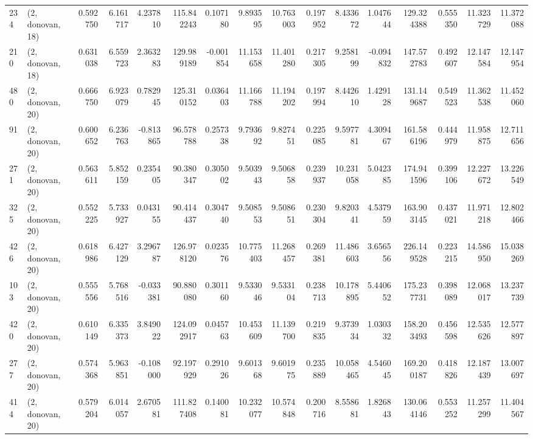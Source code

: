 \begin{tabular}{llrrrrrrrrrrrrrr}
234 &  (2, donovan, 18) &   0.592750 &   6.161717 &   4.237810 &   115.842243 &   0.107180 &   9.893595 &  10.763003 &  0.197952 &   8.433672 &   1.047644 &   129.324388 &  0.555350 &  11.323729 &  11.372088 \\
210 &  (2, donovan, 18) &   0.631038 &   6.559723 &   2.363283 &   129.989189 &  -0.001854 &  11.153658 &  11.401280 &  0.217305 &   9.258199 &  -0.094832 &   147.572783 &  0.492607 &  12.147584 &  12.147954 \\
480 &  (2, donovan, 20) &   0.666750 &   6.923079 &   0.782945 &   125.310152 &   0.036403 &  11.166788 &  11.194202 &  0.197994 &   8.442610 &   1.429128 &   131.149687 &  0.549523 &  11.362538 &  11.452060 \\
91  &  (2, donovan, 20) &   0.600652 &   6.236763 &  -0.813865 &    96.578788 &   0.257338 &   9.793692 &   9.827451 &  0.225085 &   9.597781 &   4.309467 &   161.586196 &  0.444979 &  11.958875 &  12.711656 \\
271 &  (2, donovan, 20) &   0.563611 &   5.852159 &   0.235405 &    90.380347 &   0.305002 &   9.503943 &   9.506858 &  0.239937 &  10.231058 &   5.042385 &   174.941596 &  0.399106 &  12.227672 &  13.226549 \\
325 &  (2, donovan, 20) &   0.552225 &   5.733927 &   0.043155 &    90.414437 &   0.304740 &   9.508553 &   9.508651 &  0.230304 &   9.820341 &   4.537959 &   163.903145 &  0.437021 &  11.971218 &  12.802466 \\
426 &  (2, donovan, 20) &   0.618986 &   6.427129 &   3.296787 &   126.978120 &   0.023576 &  10.775403 &  11.268457 &  0.269381 &  11.486603 &   3.656556 &   226.149528 &  0.223215 &  14.586950 &  15.038269 \\
103 &  (2, donovan, 20) &   0.555556 &   5.768516 &  -0.033381 &    90.880080 &   0.301160 &   9.533046 &   9.533104 &  0.238713 &  10.178895 &   5.440652 &   175.237731 &  0.398089 &  12.068017 &  13.237739 \\
420 &  (2, donovan, 20) &   0.610149 &   6.335373 &   3.849022 &   124.092917 &   0.045763 &  10.453609 &  11.139700 &  0.219835 &   9.373934 &   1.030332 &   158.203493 &  0.456598 &  12.535626 &  12.577897 \\
277 &  (2, donovan, 20) &   0.574368 &   5.963851 &  -0.108000 &    92.197929 &   0.291026 &   9.601368 &   9.601975 &  0.235889 &  10.058465 &   4.546045 &   169.200187 &  0.418826 &  12.187439 &  13.007697 \\
414 &  (2, donovan, 20) &   0.579204 &   6.014057 &   2.670581 &   111.827408 &   0.140081 &  10.232077 &  10.574848 &  0.200716 &   8.558681 &   1.826843 &   130.064146 &  0.553252 &  11.257299 &  11.404567 \\

\end{tabular}
